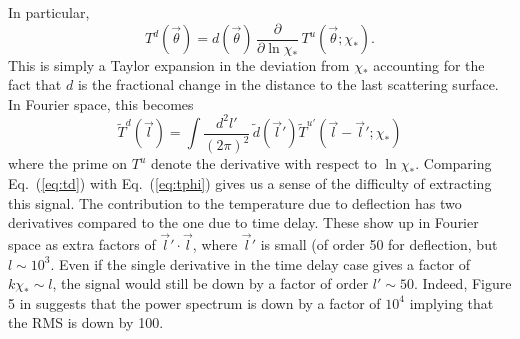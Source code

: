\documentclass[prd,amsmath,amssymb,floatfix,superscriptaddress,nofootinbib,preprintnumbers]{revtex4-1}
\def\be{\begin{equation}}
\def\ee{\end{equation}}
\newcommand{\ec}[1]{Eq.~(\ref{eq:#1})}
\newcommand{\eql}[1]{\label{eq:#1}}
\begin{document}
In particular,
\be
T^d(\vec\theta) = d(\vec\theta)\,\frac{\partial}{\partial\ln\chi_*}\, T^u(\vec\theta;\chi_*).
\ee
This is simply a Taylor expansion in the deviation from $\chi_*$ accounting for the fact that $d$ is the fractional change in the distance to the last scattering surface. In Fourier space, this becomes
\begin{equation}
\tilde T^d(\vec l) = \int \frac{d^2l'}{(2\pi)^2}\, \tilde d(\vec l') \tilde T^{u'}(\vec l-\vec l';\chi_*) %
\eql{td}\end{equation}
where the prime on $T^u$ denote the  derivative with respect to $\ln\chi_*$. Comparing \ec{td} with \ec{tphi}  gives us a sense of the difficulty of extracting this signal. The contribution to the temperature due to deflection has two derivatives compared to the one due to time delay. These show up in Fourier space as extra factors of $\vec l'\cdot\vec l$, where $\vec l'$ is small (of order 50 for deflection, but $l\sim 10^3$. Even if the single derivative in the time delay case gives a factor of $k\chi_*\sim l$, the signal would still be down by a factor of order $l'\sim50$. Indeed, Figure 5 in \cite{Hu:2001yq} suggests that the power spectrum is down by a factor of $10^4$ implying that the RMS is down by 100. %
\end{document}
